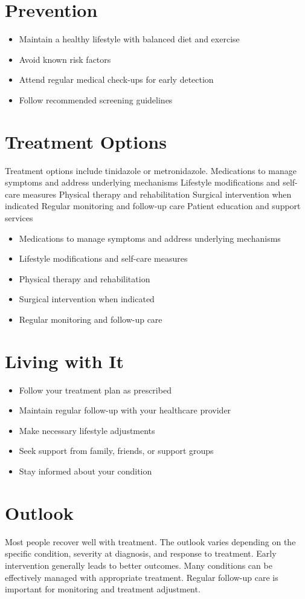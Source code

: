 \section{Prevention}
\begin{itemize}[noitemsep]
  \item Maintain a healthy lifestyle with balanced diet and exercise
  \item Avoid known risk factors
  \item Attend regular medical check-ups for early detection
  \item Follow recommended screening guidelines
\end{itemize}
\section{Treatment Options}
Treatment options include tinidazole or metronidazole. Medications to manage symptoms and address underlying mechanisms Lifestyle modifications and self-care measures Physical therapy and rehabilitation Surgical intervention when indicated Regular monitoring and follow-up care Patient education and support services

\begin{itemize}[noitemsep]
  \item Medications to manage symptoms and address underlying mechanisms
  \item Lifestyle modifications and self-care measures
  \item Physical therapy and rehabilitation
  \item Surgical intervention when indicated
  \item Regular monitoring and follow-up care
\end{itemize}
\section{Living with It}
\begin{itemize}[noitemsep]
  \item Follow your treatment plan as prescribed
  \item Maintain regular follow-up with your healthcare provider
  \item Make necessary lifestyle adjustments
  \item Seek support from family, friends, or support groups
  \item Stay informed about your condition
\end{itemize}
\section{Outlook}
Most people recover well with treatment. The outlook varies depending on the specific condition, severity at diagnosis, and response to treatment. Early intervention generally leads to better outcomes. Many conditions can be effectively managed with appropriate treatment. Regular follow-up care is important for monitoring and treatment adjustment.
